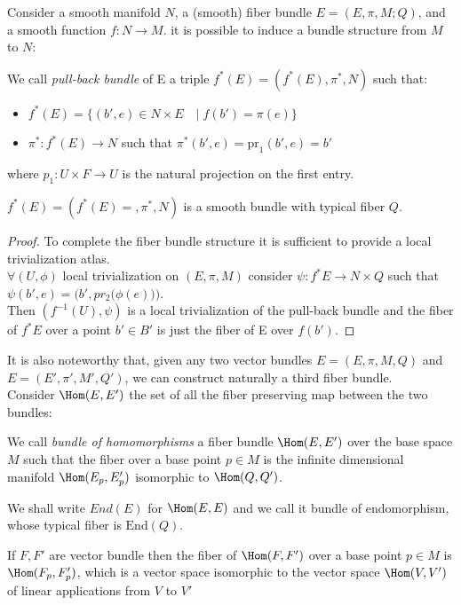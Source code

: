 \documentclass[Main]{subfiles}
\begin{document}
			Consider a smooth manifold $N$, a (smooth) fiber bundle $E=(E,\pi,M;Q)$, and a smooth function $f: N \rightarrow M$. it is possible to induce\cite{Husemoller} a bundle structure from $M$ to $N$:
			\begin{definition}
				We call \emph{pull-back bundle} of E a triple $f^* (E) = (f^* (E) , \pi^*,N)$ such that:
				\begin{itemize}
					\item $f^* (E) =  \big\{ (b',e) \in N \times E \quad \big\vert \; f(b') = \pi(e) \big\} $
					\item $\pi^*:f^* (E) \rightarrow N $ such that $ \pi^* (b',e) = \textrm{pr}_1 (b',e)= b' $
				\end{itemize}
				where $p_1 : U \times F \rightarrow U$ is the natural projection  on the first entry.
			\end{definition}
			\begin{proposition}
				$f^* (E) = (f^* (E) =, \pi^*,N)$ is a smooth bundle with typical fiber $Q$.
			\end{proposition}
			\begin{proof}
				To complete the fiber bundle structure it is sufficient to provide a local trivialization atlas.
				\\
				$\forall ( U, \phi)$ local trivialization on $(E, \pi, M)$  consider $\psi: f^* E \rightarrow N \times Q$ such that $\psi( b',e) = \bigg( b', pr_2 \big( \phi(e)\big)\bigg)$.
				\\
				Then $(f^{-1}(U),\psi)$ is a local trivialization of the pull-back bundle and the fiber of $f^*E$ over a point $b'\in B'$  is just the fiber of E over $f(b')$.
			\end{proof}

			
			It is also noteworthy that, given any two vector bundles $E =(E,\pi,M,Q)$ and $E =(E',\pi',M',Q')$, we can construct 	naturally a third fiber bundle.\\
			Consider $\Hom(E,E')$ the set of all the fiber preserving map between the two bundles:
			\begin{definition}
				We call \emph{bundle of homomorphisms} a fiber bundle $\Hom(E,E')$ over the base space $M$ such that the fiber over a base point $p\in M$ is the infinite dimensional manifold $\Hom(E_p,E'_p)$ isomorphic to $\Hom(Q,Q')$.
			\end{definition}
				We shall write $End(E)$ for $\Hom(E,E)$ and we call it bundle of endomorphism, whose typical fiber is $\textrm{End}(Q)$.
			\begin{remark}
				If $F,F'$ are vector bundle then the fiber of  $\Hom(F,F')$ over a base point $p\in M$ is $\Hom(F_p,F'_p)$, which is a vector space isomorphic to the vector space $\Hom(V,V')$ of linear applications from $V$ to $V'$
			\end{remark}
	
\end{document}
